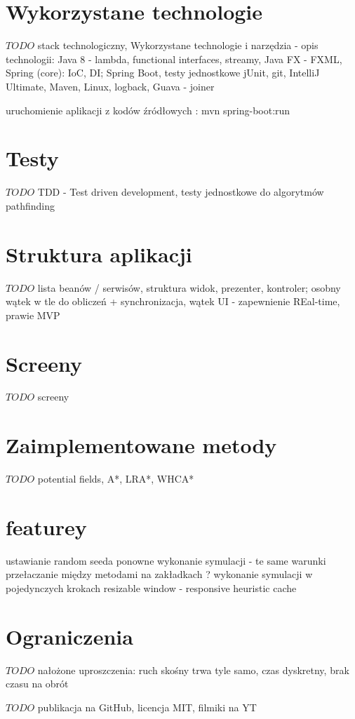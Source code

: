 \section{Wykorzystane technologie}
$TODO$ stack technologiczny, Wykorzystane technologie i narzędzia - opis technologii:
Java 8 - lambda, functional interfaces, streamy,
Java FX - FXML, Spring (core): IoC, DI; Spring Boot, testy jednostkowe jUnit, git, IntelliJ Ultimate, Maven, Linux, logback, Guava - joiner

uruchomienie aplikacji z kodów źródłowych : mvn spring-boot:run

\section{Testy}
$TODO$ TDD - Test driven development, testy jednostkowe do algorytmów pathfinding

\section{Struktura aplikacji}
$TODO$ lista beanów / serwisów, struktura widok, prezenter, kontroler; osobny wątek w tle do obliczeń + synchronizacja, wątek UI - zapewnienie REal-time, prawie MVP


\section{Screeny}
$TODO$ screeny

\section{Zaimplementowane metody}
$TODO$ potential fields, A*, LRA*, WHCA*

\section{featurey}
ustawianie random seeda
ponowne wykonanie symulacji - te same warunki
przełaczanie między metodami na zakładkach ?
wykonanie symulacji w pojedynczych krokach
resizable window - responsive
heuristic cache

\section{Ograniczenia}
$TODO$ nałożone uproszczenia: ruch skośny trwa tyle samo, czas dyskretny, brak czasu na obrót

$TODO$ publikacja na GitHub, licencja MIT, filmiki na YT